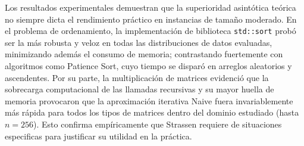 

Los resultados experimentales demuestran que la superioridad asintótica teórica no siempre dicta el rendimiento práctico en instancias de tamaño moderado. En el problema de ordenamiento, la implementación de biblioteca \texttt{std::sort} probó ser la más robusta y veloz en todas las distribuciones de datos evaluadas, minimizando además el consumo de memoria; contrastando fuertemente con algoritmos como Patience Sort, cuyo tiempo se disparó en arreglos aleatorios y ascendentes. Por su parte, la multiplicación de matrices evidenció que la sobrecarga computacional de las llamadas recursivas y su mayor huella de memoria provocaron que la aproximación iterativa Naive fuera invariablemente más rápida para todos los tipos de matrices dentro del dominio estudiado (hasta $n=256$). Esto confirma empíricamente que Strassen requiere de situaciones especificas para justificar su utilidad en la práctica.